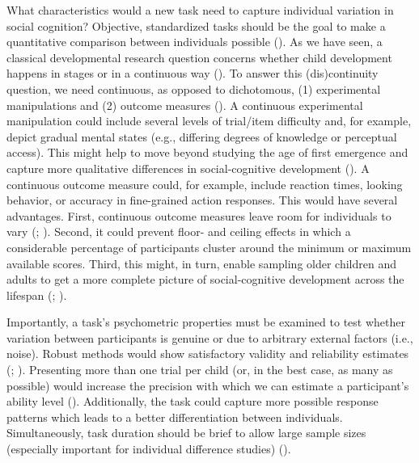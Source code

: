 \documentclass[
]{scrbook}
\begin{document}
What characteristics would a new task need to capture individual variation in social cognition? Objective, standardized tasks should be the goal to make a quantitative comparison between individuals possible (). As we have seen, a classical developmental research question concerns whether child development happens in stages or in a continuous way (). To answer this (dis)continuity question, we need continuous, as opposed to dichotomous, (1) experimental manipulations and (2) outcome measures (). A continuous experimental manipulation could include several levels of trial/item difficulty and, for example, depict gradual mental states (e.g., differing degrees of knowledge or perceptual access). This might help to move beyond studying the age of first emergence and capture more qualitative differences in social-cognitive development (). A continuous outcome measure could, for example, include reaction times, looking behavior, or accuracy in fine-grained action responses. This would have several advantages. First, continuous outcome measures leave room for individuals to vary (; ). Second, it could prevent floor- and ceiling effects in which a considerable percentage of participants cluster around the minimum or maximum available scores. Third, this might, in turn, enable sampling older children and adults to get a more complete picture of social-cognitive development across the lifespan (; ).

Importantly, a task's psychometric properties must be examined to test whether variation between participants is genuine or due to arbitrary external factors (i.e., noise). Robust methods would show satisfactory validity and reliability estimates (; ). Presenting more than one trial per child (or, in the best case, as many as possible) would increase the precision with which we can estimate a participant's ability level (). Additionally, the task could capture more possible response patterns which leads to a better differentiation between individuals. Simultaneously, task duration should be brief to allow large sample sizes (especially important for individual difference studies) ().
\end{document}

